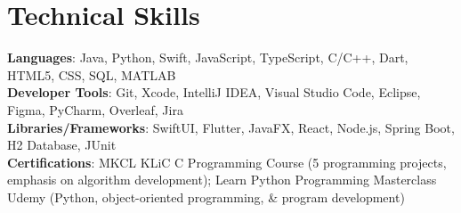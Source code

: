 \documentclass[letterpaper,10pt]{article} %
\begin{document}
\section{\textbf{Technical Skills}}
\begin{itemize}[leftmargin=0.15in, label={}]
  \small{
    \item{
      \textbf{Languages}{: Java, Python, Swift, JavaScript, TypeScript, C/C++, Dart, HTML5, CSS, SQL, MATLAB} \\
      \textbf{Developer Tools}{: Git, Xcode, IntelliJ IDEA, Visual Studio Code, Eclipse, Figma, PyCharm, Overleaf, Jira} \\
      \textbf{Libraries/Frameworks}{: SwiftUI, Flutter, JavaFX, React, Node.js, Spring Boot, H2 Database, JUnit}\\
      \textbf{Certifications}{: MKCL KLiC C Programming Course (5 programming projects, emphasis on algorithm development); Learn Python Programming Masterclass Udemy (Python, object-oriented programming, \& program development)}
    }
  }
\end{itemize}
\end{document}
